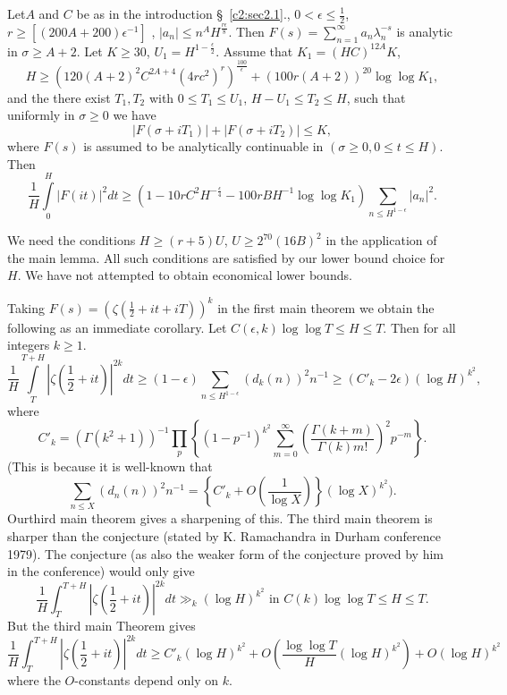 \begin{coro*}
Let\pageoriginale $A$ and $C$ be as in the introduction \S\ \ref{c2:sec2.1}., $0 < \epsilon \leq \frac{1}{2}$, $r \geq [(200 A + 200) \epsilon^{-1}]$ , $|a_n | \leq n^A H^{\frac{r\epsilon}{8}}$. Then $F(s) = \sum\limits^\infty_{n=1} a_n \lambda^{-s}_n$ is analytic in $\sigma \geq A+2$. Let  $K \geq 30$, $U_1 = H^{1-\frac{\epsilon}{2}}$. Assume that $K_1 = (HC)^{12A} K$, 
$$
H \geq (120 (A+2)^2 C^{2A+4} (4rc^2)^r)^{\frac{100}{\epsilon}} + (100r(A+2))^{20} \log \log K_1,
$$
and the there exist $T_1,T_2$ with $0 \leq T_1 \leq U_1$, $H - U_1 \leq T_2 \leq H$, such that uniformly in $\sigma \geq 0$ we have
$$
|F(\sigma + iT_1)| + |F(\sigma + iT_2)| \leq K,
$$
where $F(s)$ is assumed to be analytically continuable in $(\sigma \geq 0, 0 \leq t \leq H)$. Then
$$
\frac{1}{H} \int\limits^H_0 |F(it)|^2 dt \geq (1-10 r C^2 H^{-\frac{\epsilon}{4}} - 100 r BH^{-1} \log \log K_1) \sum\limits_{n \leq H^{1-\epsilon}} |a_n|^2.
$$
\end{coro*}

\setcounter{remark}{0}
\begin{remark}\label{c2:rem1}
We need the conditions $H \geq (r+5) U$, $U\geq 2^{70}(16B)^2$ in the application of the main lemma. All such conditions are satisfied by our lower bound choice for $H$. We have not attempted to obtain economical lower bounds.
\end{remark}

\begin{remark}\label{c2:rem2}
Taking $F(s) = (\zeta(\frac{1}{2} + it + iT))^k$ in the first main theorem we obtain the following as an immediate corollary. Let $C(\epsilon, k) \log \log T \leq H \leq T$. Then for all integers $k\geq 1$.
$$
\frac{1}{H} \int\limits^{T+H}_T |\zeta \left(\frac{1}{2} + it \right)|^{2k} dt \geq (1-\epsilon)  \sum\limits_{n\leq H^{1-\epsilon}} (d_k(n))^2 n^{-1} \geq (C'_k -2\epsilon) (\log H)^{k^2},
$$
where
$$
C'_k = (\Gamma (k^2 +1))^{-1} \prod\limits_p \left\{ (1-p^{-1})^{k^2}  \sum\limits^\infty_{m=0} \left(\frac{\Gamma(k+m)}{\Gamma(k)m!} \right)^2 p^{-m}\right\}.
$$
(This is because it is well-known that
$$
\sum\limits_{n \leq X} (d_n (n))^2 n^{-1} = \left\{ C'_k + O \left( \frac{1}{\log X}\right)\right\} (\log X)^{k^2}).
$$
Our\pageoriginale third main theorem gives a sharpening of this. The third main theorem is sharper than the conjecture (stated by K. Ramachandra \cite{Ramachandra7} in Durham conference 1979). The conjecture (as also the weaker form of the conjecture proved by him in the conference) would only give
$$
 \frac{1}{H} \int^{T+H}_{T} |\zeta \left(\frac{1}{2} + it \right)|^{2k} dt \gg_k (\log H)^{k^2} \text{ in  } C(k) \log \log T \leq H \leq T.
$$
But the third main Theorem gives
{\fontsize{10}{12}\selectfont
$$ 
\frac{1}{H} \int^{T+H}_T |\zeta \left(\frac{1}{2} + it \right)|^{2k} dt \geq C'_k (\log H)^{k^2} + O \left(\frac{\log \log T}{H} (\log H)^{k^2} \right) + O (\log H)^{k^2}
$$}
where the $O$-constants depend only on $k$. 
\end{remark}


